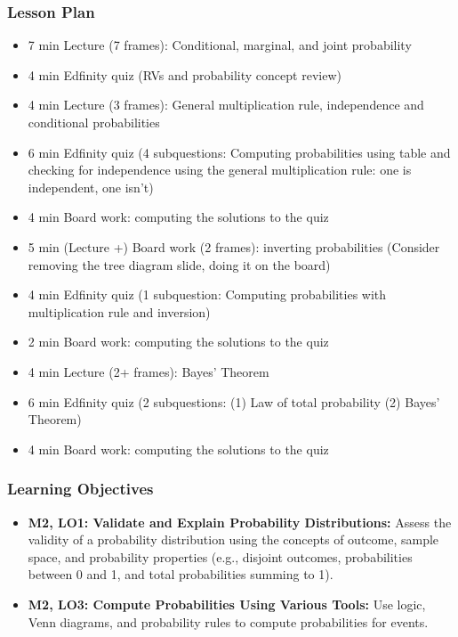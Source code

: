 \begin{frame}
    \frametitle{Lesson Plan}
    \begin{itemize}
        \item 7 min Lecture (7 frames): Conditional, marginal, and joint probability
        \item 4 min Edfinity quiz (RVs and probability concept review)
        \item 4 min Lecture (3 frames): General multiplication rule, independence and conditional probabilities
        \item 6 min Edfinity quiz (4 subquestions: Computing probabilities using table and checking for independence using the general multiplication rule: one is independent, one isn't)
        \item 4 min Board work: computing the solutions to the quiz
        \item 5 min (Lecture +) Board work (2 frames): inverting probabilities (Consider removing the tree diagram slide, doing it on the board)
        \item 4 min Edfinity quiz (1 subquestion: Computing probabilities with multiplication rule and inversion)
        \item 2 min Board work: computing the solutions to the quiz
        \item 4 min Lecture (2+ frames): Bayes' Theorem
        \item 6 min Edfinity quiz (2 subquestions: (1) Law of total probability (2) Bayes' Theorem)
        \item 4 min Board work: computing the solutions to the quiz
    \end{itemize}
\end{frame}

\begin{frame}
    \frametitle{Learning Objectives}
    \begin{itemize}
        \item \textbf{M2, LO1: Validate and Explain Probability Distributions:} Assess the validity of a probability distribution using the concepts of outcome, sample space, and probability properties (e.g., disjoint outcomes, probabilities between 0 and 1, and total probabilities summing to 1).
        \item \textbf{M2, LO3: Compute Probabilities Using Various Tools:} Use logic, Venn diagrams, and probability rules to compute probabilities for events.
    \end{itemize}
\end{frame}

